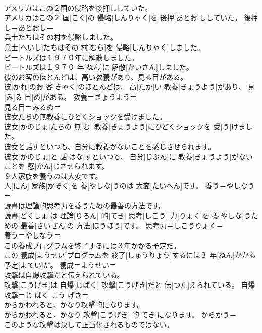 \documentclass[8pt]{extreport}
\begin{document}
\begin{CJK}{UTF8}{min}
\\	アメリカはこの２国の侵略を後押ししていた。	
\\	アメリカはこの２ 国[こく]の 侵略[しんりゃく]を 後押[あとお]ししていた。	後押し＝あとおし＝ 
\\	兵士たちはその村を侵略しました。	
\\	兵士[へいし]たちはその 村[むら]を 侵略[しんりゃく]しました。	
\\	ビートルズは１９７０年に解散しました。	
\\	ビートルズは１９７０ 年[ねん]に 解散[かいさん]しました。	
\\	彼のお客のほとんどは、高い教養があり、見る目がある。	
\\	彼[かれ]のお 客[きゃく]のほとんどは、 高[たか]い 教養[きょうよう]があり、 見[み]る 目[め]がある。	教養＝きょうよう＝ 
\\	見る目＝みるめ＝ 
\\	彼女たちの無教養にひどくショックを受けました。	
\\	彼女[かのじょ]たちの 無[む] 教養[きょうよう]にひどくショックを 受[う]けました。	
\\	彼女と話すといつも、自分に教養がないことを感じさせられます。	
\\	彼女[かのじょ]と 話[はな]すといつも、 自分[じぶん]に 教養[きょうよう]がないことを 感[かん]じさせられます。	
\\	９人家族を養うのは大変です。	
\\	人[にん] 家族[かぞく]を 養[やしな]うのは 大変[たいへん]です。	養う＝やしなう＝ 
\\	読書は理論的思考力を養うための最善の方法です。	
\\	読書[どくしょ]は 理論[りろん] 的[てき] 思考[しこう] 力[りょく]を 養[やしな]うための 最善[さいぜん]の 方法[ほうほう]です。	思考力＝しこうりょく＝ 
\\	養う＝やしなう＝ 
\\	この養成プログラムを終了するには３年かかる予定だ。	
\\	この 養成[ようせい]プログラムを 終了[しゅうりょう]するには３ 年[ねん]かかる 予定[よてい]だ。	養成＝ようせい＝ 
\\	攻撃は自爆攻撃だと伝えられている。	
\\	攻撃[こうげき]は 自爆[じばく] 攻撃[こうげき]だと 伝[つた]えられている。	自爆攻撃＝じ ばく こう げき＝ 
\\	からかわれると、かなり攻撃的になります。	
\\	からかわれると、かなり 攻撃[こうげき] 的[てき]になります。	からかう＝ 
\\	このような攻撃は決して正当化されるものではない。	

\end{CJK}
\end{document}
